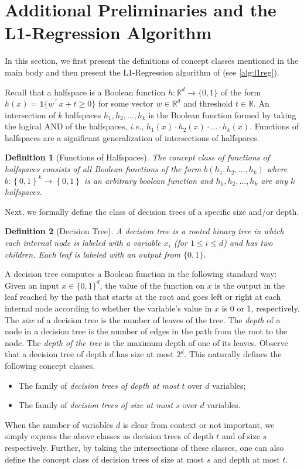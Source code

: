 \documentclass[11pt]{article}
\theoremstyle{plain}
\newtheorem{definition}{Definition}
\theoremstyle{definition}
\theoremstyle{remark}
\newcommand{\sinbrace}[1]{\{#1\}}
\newcommand{\inbrace}[1]{\left\{#1\right\}}
\newcommand{\R}{\mathbb{R}}
\newcommand{\zo}{\ensuremath{\inbrace{0, 1}}}
\newcommand{\ie}{\textit{i.e.}}
\newcommand{\lreg}{\textsf{L1-Regression}}
\begin{document}
\section{Additional Preliminaries and the \lreg{} Algorithm}
    In this section, we first present the definitions of concept classes mentioned in the main body and then present the \lreg{} algorithm of \citet*{kalai2008agnostically} (see \cref{alg:l1reg}).
    
    Recall that a halfspace is a Boolean function $h\colon \R^d \rightarrow \{0, 1\}$ of the form $h(x) = \mathds{1}\sinbrace{w^\top x + t \geq 0}$ for some vector $w \in \R^d$ and threshold $t\in \R$. 
    An intersection of $k$ halfspaces $h_1,h_2,\dots,h_k$ is the Boolean function formed by taking the logical AND of the halfspaces, \ie{}, $h_1(x)\cdot h_2(x)\cdot \dots\cdot h_k(x)$.
    Functions of halfspaces are a significant generalization of intersections of halfspaces.
    \begin{definition}[Functions of Halfspaces]
        The concept class of functions of halfspaces consists of all Boolean functions of the form $b(h_1,h_2,\dots,h_k)$ where $b\colon \zo^k\to \zo$ is an arbitrary boolean function and $h_1,h_2,\dots,h_k$ are any $k$ halfspaces.
    \end{definition}
    Next, we formally define the class of decision trees of a specific size and/or depth.
    \begin{definition}[Decision Tree]
        A decision tree is a rooted binary tree in which each internal node is labeled with a variable $x_i$ (for $1\leq i\leq d$) and has two children. 
        Each leaf is labeled with an output from $\{0, 1\}$.
    \end{definition} 
    A decision tree computes a Boolean function in the following standard way: Given an input $x \in \{0,1\}^d$, the value of the function on $x$ is the output in the leaf reached by the path that starts at the root and goes left or right at each internal node according to whether the variable’s value in $x$ is 0 or 1, respectively.
    The \textit{size} of a decision tree is the number of leaves of the tree. The \textit{depth} of a node in a decision tree is the number of edges in the path from the root to the node.
    The \textit{depth of the tree} is the maximum depth of one of its leaves.
    Observe that a decision tree of depth $d$ has size at most $2^d$.
    This naturally defines the following concept classes.
    \begin{itemize}
        \item The family of \textit{decision trees of depth at most $t$} over $d$ variables; %
        \item The family of \textit{decision trees of size at most $s$} over $d$ variables.
    \end{itemize}
    When the number of variables $d$ is clear from context or not important, we simply express the above classes as decision trees of depth $t$ and of size $s$ respectively.
    Further, by taking the intersections of these classes, one can also define the concept class of decision trees of size at most $s$ and depth at most $t$.
    
\end{document}
